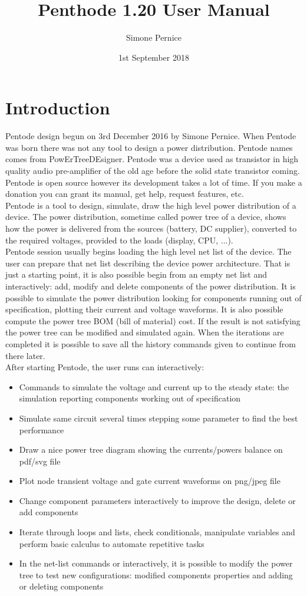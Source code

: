 \documentclass[12pt,a4paper]{book}
\author{Simone Pernice}
\title{Penthode 1.20 User Manual}
\date{1st September 2018}
\begin{document}
\maketitle
\chapter{Introduction}
Pentode design begun on 3rd December 2016 by Simone Pernice. When Pentode was born there was not any tool to design a power distribution.  
Pentode names comes from PowErTreeDEsigner. Pentode was a device used as transistor in high quality audio pre-amplifier of the old age before the solid state transistor coming.\\
Pentode is open source however its development takes a lot of time. If you make a donation you can grant its manual, get help, request features, etc.\\
Pentode is a tool to design, simulate, draw the high level power distribution of a device. The power distribution, sometime called power tree of a device, shows how the power is delivered from the sources (battery, DC supplier), converted to the required voltages, provided to the loads (display, CPU, ...).\\
Pentode session usually begins loading the high level net list of the device. The user can prepare that net list describing the device power architecture. That is just a starting point, it is also possible begin from an empty net list and interactively: add, modify and delete components of the power distribution. It is possible to simulate the power distribution looking for components running out of specification, plotting their current and voltage waveforms. It is also possible compute the power tree BOM (bill of material) cost. If the result is not satisfying the power tree can be modified and simulated again. When the iterations are completed it is possible to save all the history commands given to continue from there later.\\
After starting Pentode, the user runs can interactively: 
\begin{itemize}
\item Commands to simulate the voltage and current up to the steady state: the simulation reporting components working out of specification
\item Simulate same circuit several times stepping some parameter to find the best performance
\item Draw a nice power tree diagram showing the currents/powers balance on pdf/svg file
\item Plot node transient voltage and gate current waveforms on png/jpeg file
\item Change component parameters interactively to improve the design, delete or add components 
\item Iterate through loops and lists, check conditionals, manipulate variables and perform basic calculus to automate repetitive tasks
\item In the net-list commands or interactively, it is possible to modify the power tree to test new configurations: modified components properties and adding or deleting components
\end{itemize}
\end{document}
